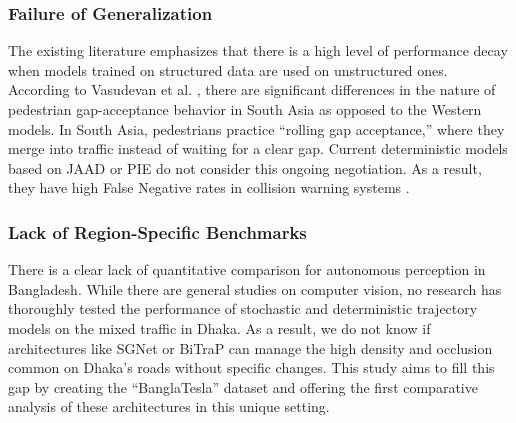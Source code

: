 \documentclass[12pt, a4paper]{article}
\begin{document}
\subsubsection{Failure of Generalization}

The existing literature emphasizes that there is a high level of performance decay when models trained on structured data are used on unstructured ones. According to Vasudevan et al. \cite{vasudevan2020pedestrian}, there are significant differences in the nature of pedestrian gap-acceptance behavior in South Asia as opposed to the Western models. In South Asia, pedestrians practice ``rolling gap acceptance,'' where they merge into traffic instead of waiting for a clear gap. Current deterministic models based on JAAD or PIE do not consider this ongoing negotiation. As a result, they have high False Negative rates in collision warning systems \cite{katyal2020intent}.

\subsubsection{Lack of Region-Specific Benchmarks}
There is a clear lack of quantitative comparison for autonomous perception in Bangladesh. While there are general studies on computer vision, no research has thoroughly tested the performance of stochastic and deterministic trajectory models on the mixed traffic in Dhaka. As a result, we do not know if architectures like SGNet \cite{wang2022stepwise} or BiTraP \cite{yao2021bitrap} can manage the high density and occlusion common on Dhaka's roads without specific changes. This study aims to fill this gap by creating the ``BanglaTesla'' dataset and offering the first comparative analysis of these architectures in this unique setting.
\end{document}

